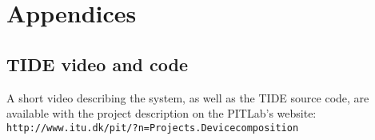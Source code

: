 \part*{Appendices}

\appendix
\chapter{TIDE video and code}
\label{video}

A short video describing the system, as well as the TIDE source code, are available with the project description on the PITLab's website:\\
\linebreak
\texttt{http://www.itu.dk/pit/?n=Projects.Devicecomposition}


